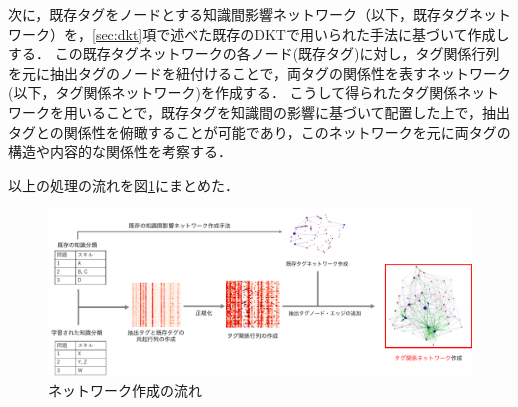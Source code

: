 %
%

次に，既存タグをノードとする知識間影響ネットワーク（以下，既存タグネットワーク）を，\ref{sec:dkt}項で述べた既存のDKTで用いられた手法に基づいて作成しする．
この既存タグネットワークの各ノード(既存タグ)に対し，タグ関係行列を元に抽出タグのノードを紐付けることで，両タグの関係性を表すネットワーク(以下，タグ関係ネットワーク)を作成する．
こうして得られたタグ関係ネットワークを用いることで，既存タグを知識間の影響に基づいて配置した上で，抽出タグとの関係性を俯瞰することが可能であり，このネットワークを元に両タグの構造や内容的な関係性を考察する．

以上の処理の流れを図\ref{fig:networkflow}にまとめた．

\begin{figure}[htb]
\begin{center}
\includegraphics[width=400pt]{./img/networkflow2.pdf}
\end{center}
\caption{ネットワーク作成の流れ}
\label{fig:networkflow}
\end{figure}


